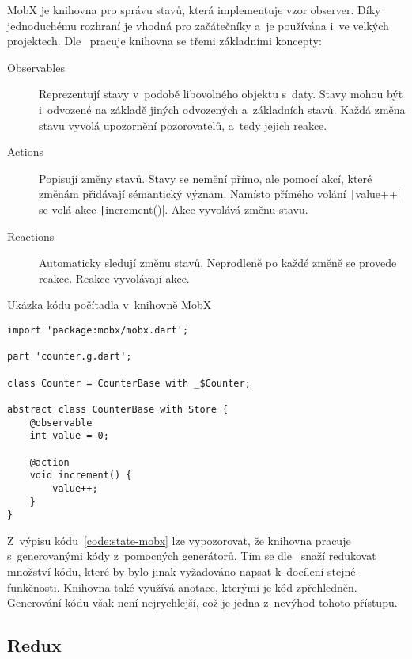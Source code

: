 MobX je knihovna pro správu stavů,
která implementuje vzor observer.
Díky jednoduchému rozhraní je vhodná pro začátečníky
a~je používána i~ve velkých projektech.
Dle~\cite{mobx_core_concepts} pracuje knihovna se třemi základními koncepty:

\begin{description}
    \item[Observables] Reprezentují stavy v~podobě libovolného objektu s~daty.
    Stavy mohou být i~odvozené na základě jiných odvozených a~základních stavů.
    Každá změna stavu vyvolá upozornění pozorovatelů, a~tedy jejich reakce.
    \item[Actions] Popisují změny stavů.
    Stavy se nemění přímo,
    ale pomocí akcí,
    které změnám přidávají sémantický význam.
    Namísto přímého volání \texttt|value++| se volá akce
    \texttt|increment()|.
    Akce vyvolává změnu stavu.
    \item[Reactions] Automaticky sledují změnu stavů.
    Neprodleně po každé změně se provede reakce.
    Reakce vyvolávají akce.
\end{description}

\begin{listing}
    \caption{Ukázka kódu počítadla v~knihovně MobX~\cite{mobx_core_concepts}}
    \label{code:state-mobx}
    \begin{verbatim}
import 'package:mobx/mobx.dart';

part 'counter.g.dart';

class Counter = CounterBase with _$Counter;

abstract class CounterBase with Store {
    @observable
    int value = 0;

    @action
    void increment() {
        value++;
    }
}
    \end{verbatim}
\end{listing}

Z~výpisu kódu~\ref{code:state-mobx} lze vypozorovat,
že knihovna pracuje s~generovanými kódy z~pomocných generátorů.
Tím se dle~\cite{mobx_core_concepts} snaží redukovat množství kódu,
které by bylo jinak vyžadováno napsat k~docílení stejné funkčnosti.
Knihovna také využívá anotace,
kterými je kód zpřehledněn.
Generování kódu však není nejrychlejší,
což je jedna z~nevýhod tohoto přístupu.

\pagebreak
\subsection{Redux}

